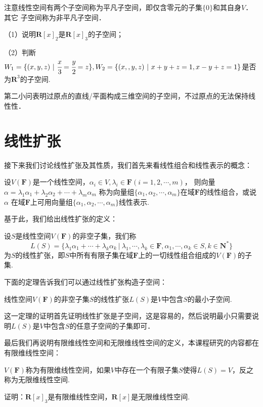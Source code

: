 注意线性空间有两个子空间称为平凡子空间，即仅含零元的子集$\{0\}$和其自身$V$．其它
子空间称为非平凡子空间．
\begin{example}
	\textup{（1）}说明$\mathbf{R}[x]_2$是$\mathbf{R}[x]_3$的子空间\textup{；}

	\textup{（2）}判断$W_1=\{(x,y,z)\ |\ \cfrac{x}{3}=\cfrac{y}{2}=z\},
		W_2=\{(x,,y,z)\ |\ x+y+z=1,x-y+z=1\}$是否为$\mathbf{R}^3$的子空间.
\end{example}
第二小问表明过原点的直线/平面构成三维空间的子空间，不过原点的无法保持线性性．

\section{线性扩张}
接下来我们讨论线性扩张及其性质，我们首先来看线性组合和线性表示的概念：
\begin{definition}
	设$V(\mathbf{F})$是一个线性空间，$\alpha_i\in V,\lambda_i\in \mathbf{F}(i=1,2,\cdots,m)$，
	则向量$\alpha=\lambda_1\alpha_1+\lambda_2\alpha_2+\cdots+\lambda_m\alpha_m$
	称为向量组$\{\alpha_1,\alpha_2,\cdots,\alpha_m\}$在域$\mathbf{F}$的线性组合，或说$\alpha$
	在域$\mathbf{F}$上可用向量组$\{\alpha_1,\alpha_2,\cdots,\alpha_m\}$线性表示.
\end{definition}
基于此，我们给出线性扩张的定义：
\begin{definition}
	设$S$是线性空间$V(\mathbf{F})$的非空子集，我们称
	$$L(S)=\{\lambda_1\alpha_1+\cdots+\lambda_k\alpha_k\ |\ \lambda_1,\cdots,\lambda_k\in\mathbf{F},\alpha_1,\cdots,\alpha_k\in S,k\in\mathbf{N^*}\}$$
	为$S$的线性扩张，即$S$中所有有限子集在域$\mathbf{F}$上的一切线性组合组成的$V(\mathbf{F})$的子集.
\end{definition}
下面的定理告诉我们可以通过线性扩张构造子空间：
\begin{theorem}
	线性空间$V(\mathbf{F})$的非空子集$S$的线性扩张$L(S)$是$V$中包含$S$的最小子空间.
\end{theorem}
这一定理的证明首先证明线性扩张是子空间，这是容易的，然后说明最小只需要说明$L(S)$是$V$中包含$S$的任意子空间的子集即可．

最后我们再说明有限维线性空间和无限维线性空间的定义，本课程研究的内容都在有限维线性空间：
\begin{definition}
	$V(\mathbf{F})$称为有限维线性空间，如果$V$中存在一个有限子集$S$使得$L(S)=V$，反之称为无限维线性空间.
\end{definition}
\begin{example}
	证明：$\mathbf{R}[x]_3$是有限维线性空间，$\mathbf{R}[x]$是无限维线性空间.
\end{example}

